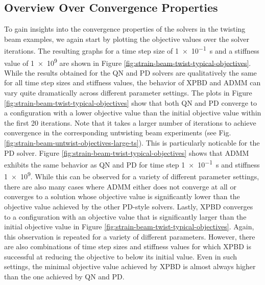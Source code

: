 \subsection{Overview Over Convergence Properties}\label{ss:twisting-beam-strain-convergence}
To gain insights into the convergence properties of the solvers in the twisting beam examples, we again start by plotting the objective values over 
the solver iterations. The resulting graphs for a time step size of \SI{1e-1}{\second} and a stiffness value of \num{1e9} are shown in 
Figure \ref{fig:strain-beam-twist-typical-objectives}. While the results obtained for the QN and PD solvers are qualitatively the same for all time step 
sizes and stiffness values, the behavior of XPBD and ADMM can vary quite dramatically across different parameter settings. The plots in 
Figure \ref{fig:strain-beam-twist-typical-objectives} show that both QN and PD converge to a configuration with a lower objective value than the initial 
objective value within the first 20 iterations. Note that it takes a larger number of iterations to achieve convergence in the corresponding untwisting beam experiments 
(see Fig. \ref{fig:strain-beam-untwist-objectives-large-ts}). This is particularly noticable for the PD solver. Figure \ref{fig:strain-beam-twist-typical-objectives} 
shows that ADMM exhibits the same behavior as QN and PD for time step \SI{1e-1}{\second} and stiffness \num{1e9}. While this can be observed for a variety of 
different parameter settings, there are also many cases where ADMM either does not converge at all or converges to a solution whose objective value is 
significantly lower than the objective value achieved by the other PD-style solvers. Lastly, XPBD converges to a configuration with an objective value that is 
significantly larger than the initial objective value in Figure \ref{fig:strain-beam-twist-typical-objectives}. Again, this observation is repeated for a variety of 
different parameters. However, there are also combinations of time step sizes and stiffness values for which XPBD is successful at reducing the objective to 
below its initial value. Even in such settings, the minimal objective value achieved by XPBD is almost always higher than the one achieved by QN and PD.

